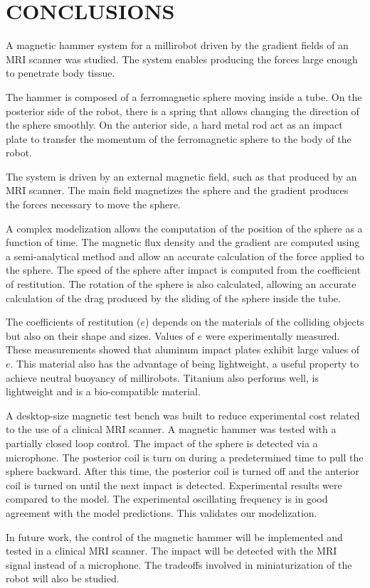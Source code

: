 \documentclass[letterpaper, 10 pt, conference]{ieeeconf}  %
\begin{document}
\section{CONCLUSIONS}
\label{conclusion}
A magnetic hammer system for a millirobot driven by the gradient fields of an MRI scanner was studied. 
The system enables producing the forces large enough to penetrate body tissue.\par
The hammer is composed of a ferromagnetic sphere moving inside a tube. 
On the posterior side of the robot, there is a spring that allows changing the direction of the sphere smoothly. 
On the anterior side, a hard metal rod act as an impact plate to transfer the momentum of the ferromagnetic sphere to the body of the robot.\par
The system is driven by an external magnetic field, such as that produced by an MRI scanner. 
The main field magnetizes the sphere and the gradient produces the forces necessary to move the sphere.\par
 A complex modelization allows the computation of the position of the sphere as a function of time. 
 The magnetic flux density and the gradient are computed using a semi-analytical method and allow an accurate calculation of the force applied to the sphere. 
 The speed of the sphere after impact is computed from the coefficient of restitution. 
 The rotation of the sphere is also calculated, allowing an accurate calculation of the drag produced by the sliding of the sphere inside the tube.\par

The coefficients of restitution ($e$) depends on the materials of the colliding objects but also on their shape and sizes. 
Values of $e$ were experimentally measured. 
These measurements showed that aluminum impact plates exhibit large values of $e$. 
This material also has the advantage of being lightweight, a useful property to achieve neutral buoyancy of millirobots. 
Titanium also performs well, is lightweight and is a bio-compatible material.\par

A desktop-size magnetic test bench was built to reduce experimental cost related to the use of a clinical MRI scanner. 
A magnetic hammer was tested with a partially closed loop control. 
The impact of the sphere is detected via a microphone. 
The posterior coil is turn on during a predetermined time to pull the sphere backward.
 After this time, the posterior coil is turned off and the anterior coil is turned on until the next impact is detected. 
 Experimental results were compared to the model.
  The experimental oscillating frequency is in good agreement with the model predictions. 
  This validates our modelization.\par
In future work, the control of the magnetic hammer will be implemented and tested in a clinical MRI scanner. 
The impact will be detected with the MRI signal instead of a microphone. 
The tradeoffs involved in miniaturization of the robot will also be studied.
\end{document}
